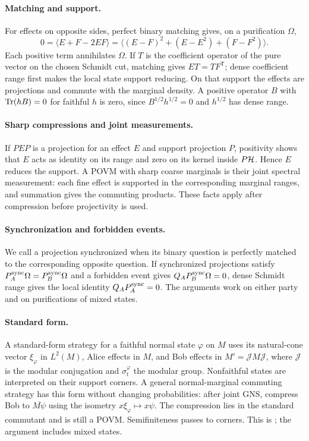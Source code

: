 \paragraph{Matching and support.}
For effects on opposite sides, perfect binary matching gives, on a purification $\Omega$,
\[
 0=\langle E+F-2EF\rangle
 =\langle(E-F)^2+(E-E^2)+(F-F^2)\rangle.
\]
Each positive term annihilates $\Omega$. If $T$ is the coefficient operator of the pure vector on the chosen Schmidt cut, matching gives $ET=T F^{\mathsf T}$; dense coefficient range first makes the local state support reducing. On that support the effects are projections and commute with the marginal density. A positive operator $B$ with $\operatorname{Tr}(hB)=0$ for faithful $h$ is zero, since $B^{1/2}h^{1/2}=0$ and $h^{1/2}$ has dense range.

\paragraph{Sharp compressions and joint measurements.}
If $PEP$ is a projection for an effect $E$ and support projection $P$, positivity shows that $E$ acts as identity on its range and zero on its kernel inside $P\mathcal H$. Hence $E$ reduces the support. A POVM with sharp coarse marginals is their joint spectral measurement: each fine effect is supported in the corresponding marginal ranges, and summation gives the commuting products. These facts apply after compression before projectivity is used.

\paragraph{Synchronization and forbidden events.}
We call a projection synchronized when its binary question is perfectly matched to the corresponding opposite question. If synchronized projections satisfy $P_A^{\rm sync}\Omega=P_B^{\rm sync}\Omega$ and a forbidden event gives $Q_AP_B^{\rm sync}\Omega=0$, dense Schmidt range gives the local identity $Q_AP_A^{\rm sync}=0$. The arguments work on either party and on purifications of mixed states.

\paragraph{Standard form.}
A standard-form strategy for a faithful normal state $\varphi$ on $M$ uses its natural-cone vector $\xi_\varphi$ in $L^2(M)$, Alice effects in $M$, and Bob effects in $M'=\mathcal JM\mathcal J$, where $\mathcal J$ is the modular conjugation and $\sigma_t^\varphi$ the modular group. Nonfaithful states are interpreted on their support corners. A general normal-marginal commuting strategy has this form without changing probabilities: after joint GNS, compress Bob to $\overline{M\psi}$ using the isometry $x\xi_\varphi\mapsto x\psi$. The compression lies in the standard commutant and is still a POVM. Semifiniteness passes to corners. This is \cite[Lemma 1.6]{ReadType}; the argument includes mixed states.

